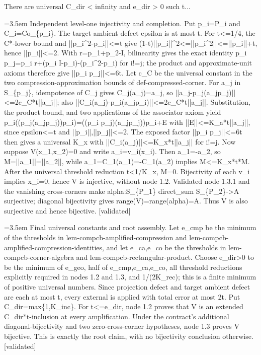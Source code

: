 \documentclass{article}
\newcommand{\step}[1]{\par\noindent\hangindent=3.5em\hangafter=1%
  \makebox[3.5em][l]{\textbf{#1.}}}
\newcommand{\steptag}[1]{\hfill{\small\textsf{[#1]}}}
\begin{document}
\begin{proofbox}{There are universal C\_dir < infinity and e\_dir > 0 such t...}
\step{1.3.2.1} Independent level-one injectivity and completion. Put p\_i=P\_i and C\_i=Co\_\{p\_i\}. The target ambient defect epsilon is at most t. For t<=1/4, the C*-lower bound and ||p\_i\textasciicircum{}2-p\_i||<=t give (1-t)||p\_i||\textasciicircum{}2<=||p\_i\textasciicircum{}2||<=||p\_i||+t, hence ||p\_i||<=2. With r=p\_1+p\_2-I, bilinearity gives the exact identity p\_i p\_j=p\_i r+(p\_i I-p\_i)-(p\_i\textasciicircum{}2-p\_i) for i!=j; the product and approximate-unit axioms therefore give ||p\_i p\_j||<=6t. Let c\_C be the universal constant in the two compression-approximation bounds of def-compressed-corner. For a\_j in S\_\{p\_j\}, idempotence of C\_j gives C\_j(a\_j)=a\_j, so ||a\_j-p\_j(a\_jp\_j)||<=2c\_C*t||a\_j||; also ||C\_i(a\_j)-p\_i(a\_jp\_i)||<=2c\_C*t||a\_j||. Substitution, the product bound, and two applications of the associator axiom yield p\_i((p\_j(a\_jp\_j))p\_i)=((p\_i p\_j)(a\_jp\_j))p\_i+E with ||E||<=K\_a*t||a\_j||, since epsilon<=t and ||p\_i||,||p\_j||<=2. The exposed factor ||p\_i p\_j||<=6t then gives a universal K\_x with ||C\_i(a\_j)||<=K\_x*t||a\_j|| for i!=j. Now suppose V(x\_1,x\_2)=0 and write a\_i=v\_i(x\_i). Then a\_1=-a\_2, so M=||a\_1||=||a\_2||, while a\_1=C\_1(a\_1)=-C\_1(a\_2) implies M<=K\_x*t*M. After the universal threshold reduction t<1/K\_x, M=0. Bijectivity of each v\_i implies x\_i=0, hence V is injective, without node 1.2. Validated node 1.3.1 and the vanishing cross-corners make alpha:S\_\{P\_1\} direct\_sum S\_\{P\_2\}->A surjective; diagonal bijectivity gives range(V)=range(alpha)=A. Thus V is also surjective and hence bijective. \steptag{validated} \\[4pt]
\step{1.4} Final universal constants and root assembly. Let e\_cmp be the minimum of the thresholds in lem-compcb-amplified-compression and lem-compcb-amplified-compression-identities, and let e\_ca,e\_co be the thresholds in lem-compcb-corner-algebra and lem-compcb-rectangular-product. Choose e\_dir>0 to be the minimum of e\_geo, half of e\_cmp,e\_ca,e\_co, all threshold reductions explicitly required in nodes 1.2 and 1.3, and 1/(2K\_rec); this is a finite minimum of positive universal numbers. Since projection defect and target ambient defect are each at most t, every external is applied with total error at most 2t. Put C\_dir=max\{1,K\_inc\}. For t<=e\_dir, node 1.2 proves that V is an extended C\_dir*t-inclusion at every amplification. Under the contract's additional diagonal-bijectivity and two zero-cross-corner hypotheses, node 1.3 proves V bijective. This is exactly the root claim, with no bijectivity conclusion otherwise. \steptag{validated} \\[6pt]

\end{proofbox}
\end{document}
